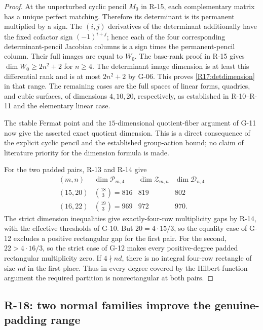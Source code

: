 \begin{proof}
At the unperturbed cyclic pencil $M_0$ in R-15, each
complementary matrix has a unique perfect matching.
Therefore its determinant is its permanent multiplied by a
sign. The $(i,j)$ derivatives of the determinant additionally
have the fixed cofactor sign $(-1)^{i+j}$; hence each of the
four corresponding determinant-pencil Jacobian columns is
a sign times the permanent-pencil column. Their full images
are equal to $W_0$. The base-rank proof in R-15 gives
$\dim W_0\geq2n^2+2$ for $n\geq4$.
The determinant image dimension is at least this differential
rank and is at most $2n^2+2$ by G-06. This proves
\eqref{R17:detdimension} in that range. The remaining cases
are the full spaces of linear forms, quadrics, and cubic
surfaces, of dimensions $4,10,20$, respectively, as established
in R-10--R-11 and the elementary linear case.

The stable Fermat point and the $15$-dimensional quotient-fiber
argument of G-11 now give the asserted exact quotient dimension.
This is a direct consequence of the explicit cyclic pencil and
the established group-action bound; no claim of literature
priority for the dimension formula is made.

For the two padded pairs, R-13 and R-14 give
\[
 \begin{array}{c|c|c|c}
 (m,n)&\dim\mathcal P_{m,4}&\dim\mathcal Z_{m,n}
                    &\dim\mathcal D_{n,4}\\ \hline
 (15,20)&\binom{18}{3}=816&819&802\\
 (16,22)&\binom{19}{3}=969&972&970.
 \end{array}
\]
The strict dimension inequalities give exactly-four-row
multiplicity gaps by R-14, with the effective thresholds of
G-10. But $20=4\cdot15/3$, so the equality case of G-12
excludes a positive rectangular gap for the first pair.
For the second, $22>4\cdot16/3$, so the strict case of G-12
makes every positive-degree padded rectangular multiplicity
zero. If $4\nmid nd$, there is no integral four-row rectangle
of size $nd$ in the first place. Thus in every degree covered
by the Hilbert-function argument the required partition is
nonrectangular at both pairs.
\end{proof}


\subsection{R-18: two normal families improve the genuine-padding range}

